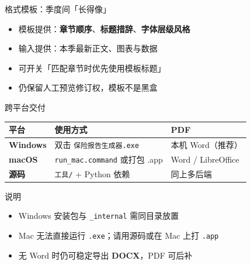 \documentclass[aspectratio=169,10pt,UTF8]{ctexbeamer}
\begin{document}
\begin{frame}{格式模板：季度间「长得像」}
  \centering

  \vspace{1em}
  \begin{itemize}
    \item 模板提供：\textbf{章节顺序}、\textbf{标题措辞}、\textbf{字体层级风格}
    \item 输入提供：本季最新正文、图表与数据
    \item 可开关「匹配章节时优先使用模板标题」
    \item 仍保留人工预览修订权，模板不是黑盒
  \end{itemize}
\end{frame}

\begin{frame}{跨平台交付}
  \begin{table}
    \centering
    \renewcommand{\arraystretch}{1.25}
    \begin{tabular}{>{\bfseries}l ll}
      \toprule
      平台 & 使用方式 & PDF \\
      \midrule
      Windows & 双击 \texttt{保险报告生成器.exe} & 本机 Word（推荐） \\
      macOS & \texttt{run\_mac.command} 或打包 .app & Word / LibreOffice \\
      源码 & \texttt{工具/} + Python 依赖 & 同上多后端 \\
      \bottomrule
    \end{tabular}
  \end{table}
  \vspace{0.6em}
  \begin{block}{说明}
    \begin{itemize}
      \item Windows 安装包与 \texttt{\_internal} 需同目录放置
      \item Mac 无法直接运行 \texttt{.exe}；请用源码或在 Mac 上打 \texttt{.app}
      \item 无 Word 时仍可稳定导出 \textbf{DOCX}，PDF 可后补
    \end{itemize}
  \end{block}
\end{frame}
\end{document}
